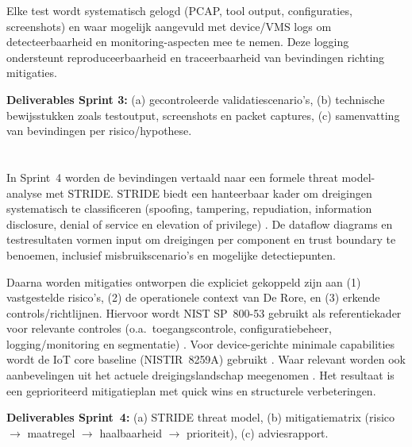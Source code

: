 Elke test wordt systematisch gelogd (PCAP, tool output, configuraties, screenshots) en waar mogelijk aangevuld met device/VMS logs om detecteerbaarheid en monitoring-aspecten mee te nemen. Deze logging ondersteunt reproduceerbaarheid en traceerbaarheid van bevindingen richting mitigaties.

\textbf{Deliverables Sprint 3:} (a) gecontroleerde validatiescenario's, (b) technische bewijsstukken zoals testoutput, screenshots en packet captures, (c) samenvatting van bevindingen per risico/hypothese.

\section{}%
\label{sec:meth-sprint4}

In Sprint~4 worden de bevindingen vertaald naar een formele threat model-analyse met STRIDE. STRIDE biedt een hanteerbaar kader om dreigingen systematisch te classificeren (spoofing, tampering, repudiation, information disclosure, denial of service en elevation of privilege) \autocite{Microsoft2022bSTRIDE}. De dataflow diagrams en testresultaten vormen input om dreigingen per component en trust boundary te benoemen, inclusief misbruikscenario’s en mogelijke detectiepunten.

Daarna worden mitigaties ontworpen die expliciet gekoppeld zijn aan (1) vastgestelde risico’s, (2) de operationele context van De Rore, en (3) erkende controls/richtlijnen. Hiervoor wordt NIST SP~800-53 gebruikt als referentiekader voor relevante controles (o.a.\ toegangscontrole, configuratiebeheer, logging/monitoring en segmentatie) \autocite{NISTSP80053r5}. Voor device-gerichte minimale capabilities wordt de IoT core baseline (NISTIR~8259A) gebruikt \autocite{fagan2020iot}. Waar relevant worden ook aanbevelingen uit het actuele dreigingslandschap meegenomen \autocite{ENISA2024ThreatLandscape}. Het resultaat is een geprioriteerd mitigatieplan met quick wins en structurele verbeteringen.

\textbf{Deliverables Sprint~4:} (a) STRIDE threat model, (b) mitigatiematrix (risico $\rightarrow$ maatregel $\rightarrow$ haalbaarheid $\rightarrow$ prioriteit), (c) adviesrapport.

\section{}%
\label{sec:meth-sprint5}

